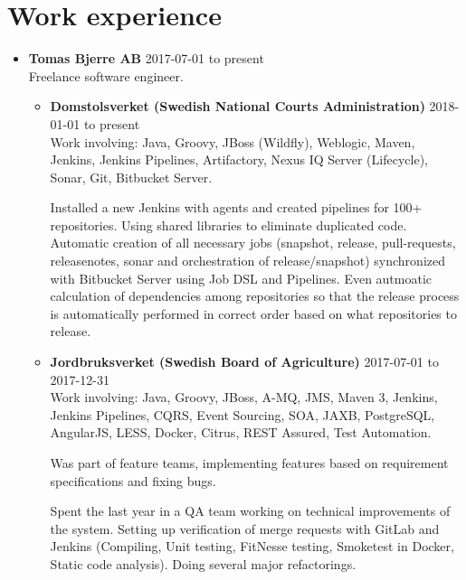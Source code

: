 \documentclass[a4paper]{article}
\begin{document}
\section*{Work experience}
\begin{itemize}
 \item \textbf{Tomas Bjerre AB} 2017-07-01 to present \\
 Freelance software engineer.
 \begin{itemize}
  \item \textbf{Domstolsverket (Swedish National Courts Administration)} 2018-01-01 to present \\
  Work involving: Java, Groovy, JBoss (Wildfly), Weblogic, Maven, Jenkins, Jenkins Pipelines, Artifactory, Nexus IQ Server (Lifecycle), Sonar, Git, Bitbucket Server.

  Installed a new Jenkins with agents and created pipelines for 100+ repositories. Using shared libraries to eliminate duplicated code. Automatic creation of all necessary jobs (snapshot, release, pull-requests, releasenotes, sonar and orchestration of release/snapshot) synchronized with Bitbucket Server using Job DSL and Pipelines. Even autmoatic calculation of dependencies among repositories so that the release process is automatically performed in correct order based on what repositories to release.
  \item \textbf{Jordbruksverket (Swedish Board of Agriculture)} 2017-07-01 to 2017-12-31 \\
  Work involving: Java, Groovy, JBoss, A-MQ, JMS, Maven 3, Jenkins, Jenkins Pipelines, CQRS, Event Sourcing, SOA, JAXB, PostgreSQL, AngularJS, LESS, Docker, Citrus, REST Assured, Test Automation.

  Was part of feature teams, implementing features based on requirement specifications and fixing bugs.

  Spent the last year in a QA team working on technical improvements of the system. Setting up verification of merge requests with GitLab and Jenkins (Compiling, Unit testing, FitNesse testing, Smoketest in Docker, Static code analysis). Doing several major refactorings.
 \end{itemize}
\end{itemize}
  
\end{document}
